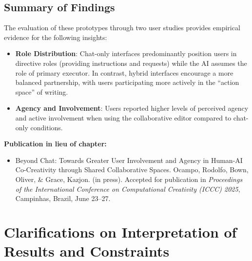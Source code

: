 \subsection{Summary of Findings}
The evaluation of these prototypes through two user studies provides empirical evidence for the following insights:
\begin{itemize}
\item \textbf{Role Distribution}: Chat-only interfaces predominantly position users in directive roles (providing instructions and requests) while the AI assumes the role of primary executor. In contrast, hybrid interfaces encourage a more balanced partnership, with users participating more actively in the ``action space'' of writing.
\item \textbf{Agency and Involvement}: Users reported higher levels of perceived agency and active involvement when using the collaborative editor compared to chat-only conditions.
\end{itemize}


\textbf{Publication in lieu of chapter:}

\begin{itemize}
    \item Beyond Chat: Towards Greater User Involvement and Agency in Human-AI Co-Creativity through Shared Collaborative Spaces. Ocampo, Rodolfo, Bown, Oliver, \& Grace, Kazjon. (in press). Accepted for publication in \textit{Proceedings of the International Conference on Computational Creativity (ICCC) 2025}, Campinhas, Brazil, June 23–27.
\end{itemize}



\section{Clarifications on Interpretation of Results and Constraints}

